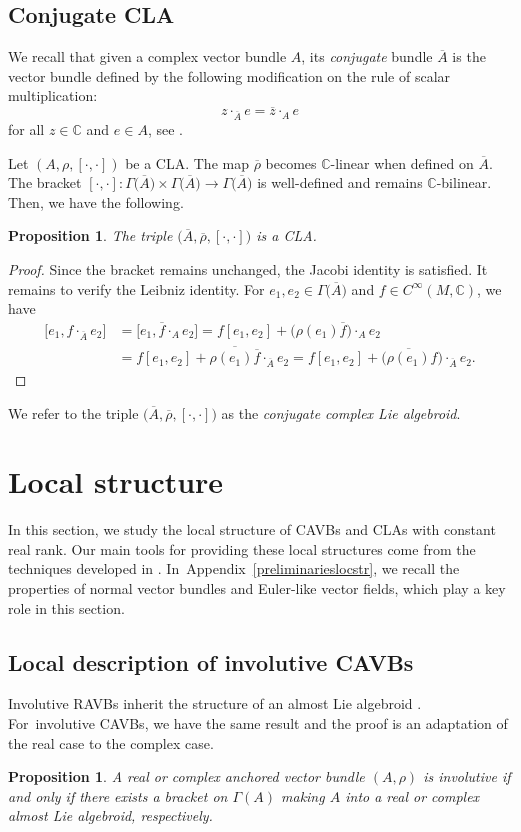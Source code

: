 \documentclass[pdftex]{sigma}
\numberwithin{equation}{section}
\newtheorem{Proposition}[Theorem]{Proposition}
 { \theoremstyle{definition}
\newtheorem{Definition}[Theorem]{Definition}
\newtheorem{Note}[Theorem]{Note}
\newtheorem{Example}[Theorem]{Example}
\newtheorem{Examples}[Theorem]{Examples}
\newtheorem{Remark}[Theorem]{Remark} }
\newcommand{\C}{{\mathbb{C}}}
\newcommand{\CMC}{C^{\infty}(M, \C)}
\newcommand{\cA}{\overline{A}}
\begin{document}
\subsection{Conjugate CLA}%
We recall that given a complex vector bundle $A$, its {\em conjugate} bundle $\cA$ is the vector bundle defined by the following modification on the rule of scalar multiplication:
\[z\cdot_{\cA}e=\overline{z}\cdot_{A} e\]
for all $z\in \C$ and $e\in A$, see \cite{milnor1974characteristic}.

Let $(A, \rho, [\cdot,\cdot])$ be a CLA. The map $\overline{\rho}$ becomes $\C$-linear when defined on $\cA$. The bracket $[\cdot,\cdot]\colon \Gamma\bigl(\overline{A}\bigr)\times \Gamma\bigl(\overline{A}\bigr)\to \Gamma\bigl(\overline{A}\bigr)$ is well-defined and remains $\C$-bilinear. Then, we have the following.

\begin{Proposition}
The triple $\bigl(\cA, \overline{\rho}, [\cdot,\cdot]\bigr)$ is a CLA.
\end{Proposition}
\begin{proof}
Since the bracket remains unchanged, the Jacobi identity is satisfied. It remains to verify the Leibniz identity. For $e_1, e_2\in \Gamma\bigl(\cA\bigr)$ and $f\in \CMC$, we have
\begin{align*}
\bigl[e_1, f\cdot_{\cA} e_2\bigr]&{}=\bigl[e_1, \overline{f}\cdot_{A}e_2\bigr]=f[e_1, e_2]+\bigl(\rho(e_1)\overline{f}\bigr)\cdot_{A}e_2\\
&{}=f[e_1, e_2]+ \overline{\rho(e_1)\overline{f}}\cdot_{\cA}e_2=f[e_1, e_2]+\bigl(\overline{\rho(e_1)}f\bigr)\cdot_{\cA}e_2.
\tag*{\qed}
\end{align*}
\renewcommand{\qed}{}
\end{proof}

We refer to the triple $\bigl(\cA, \overline{\rho}, [\cdot,\cdot]\bigr)$ as the {\em conjugate complex Lie algebroid}.
\section{Local structure}\label{locstr}
In this section, we study the local structure of CAVBs and CLAs with constant real rank. Our main tools for providing these local structures come from the techniques developed in \cite{bursztyn2019splitting}. In~Appendix~\ref{preliminarieslocstr}, we recall the properties of normal vector bundles and Euler-like vector fields, which play a key role in this section.
\subsection{Local description of involutive CAVBs}%
Involutive RAVBs inherit the structure of an almost Lie algebroid \cite[Proposition 3.17]{bursztyn2019splitting}. For~involutive CAVBs, we have the same result and the proof is an adaptation of the real case to the complex case.
\begin{Proposition}
A real or complex anchored vector bundle $(A,\rho)$ is involutive if and only if there exists a bracket on $\Gamma(A)$ making $A$ into a real or complex almost Lie algebroid, respectively.
\end{Proposition}
\end{document}
